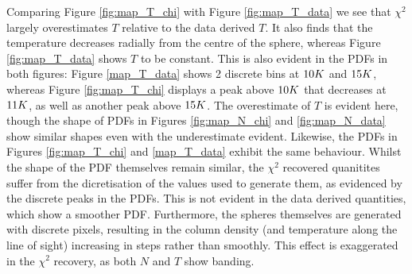 \documentclass{report}
\begin{document}
Comparing Figure \ref{fig:map_T_chi} with Figure \ref{fig:map_T_data} we see that $\chi^{2}$ largely overestimates $T$ relative to the data derived $T$. It also finds that the temperature decreases radially from the centre of the sphere, whereas Figure \ref{fig:map_T_data} shows $T$ to be constant. This is also evident in the PDFs in both figures: Figure \ref{map_T_data} shows 2 discrete bins at $10\/K$ and
$15\/K$, whereas Figure \ref{fig:map_T_chi} displays a peak above $10\/K$ that decreases at $11\/K$, as well as another peak above $15\/K$. The overestimate of $T$ is evident here, though the shape of PDFs in Figures \ref{fig:map_N_chi} and \ref{fig:map_N_data} show similar shapes even with the underestimate evident. Likewise, the PDFs in Figures
\ref{fig:map_T_chi} and \ref{map_T_data} exhibit the same behaviour. Whilst the shape of the PDF themselves remain similar, the $\chi^{2}$ recovered quanitites suffer from the dicretisation of the values used to generate them, as evidenced by the discrete peaks in the PDFs. This is not evident in the data derived quantities, which show a smoother PDF. Furthermore, the spheres themselves are generated with discrete pixels, resulting in the column density (and temperature along the line of sight) increasing in steps rather than smoothly. This effect is exaggerated in the $\chi^{2}$ recovery, as both $N$ and $T$ show banding.
\end{document}
